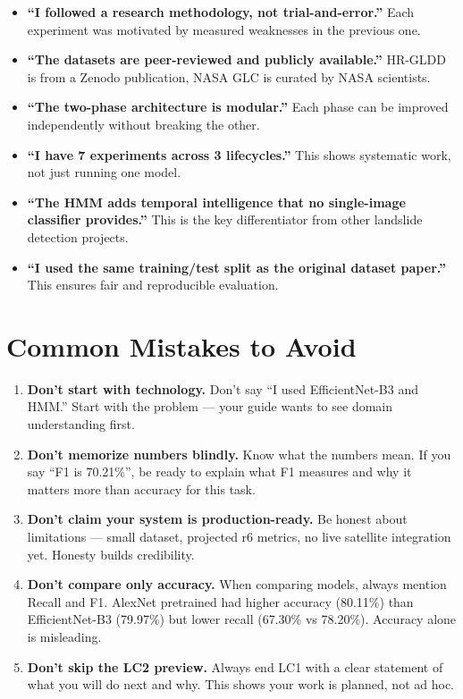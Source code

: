 \documentclass[11pt]{article}
\begin{document}
\begin{itemize}
    \item \textbf{``I followed a research methodology, not trial-and-error.''} Each experiment was motivated by measured weaknesses in the previous one.

    \item \textbf{``The datasets are peer-reviewed and publicly available.''} HR-GLDD is from a Zenodo publication, NASA GLC is curated by NASA scientists.

    \item \textbf{``The two-phase architecture is modular.''} Each phase can be improved independently without breaking the other.

    \item \textbf{``I have 7 experiments across 3 lifecycles.''} This shows systematic work, not just running one model.

    \item \textbf{``The HMM adds temporal intelligence that no single-image classifier provides.''} This is the key differentiator from other landslide detection projects.

    \item \textbf{``I used the same training/test split as the original dataset paper.''} This ensures fair and reproducible evaluation.
\end{itemize}

\section{Common Mistakes to Avoid}

\begin{enumerate}
    \item \textbf{Don't start with technology.} Don't say ``I used EfficientNet-B3 and HMM.'' Start with the problem --- your guide wants to see domain understanding first.

    \item \textbf{Don't memorize numbers blindly.} Know what the numbers mean. If you say ``F1 is 70.21\%'', be ready to explain what F1 measures and why it matters more than accuracy for this task.

    \item \textbf{Don't claim your system is production-ready.} Be honest about limitations --- small dataset, projected r6 metrics, no live satellite integration yet. Honesty builds credibility.

    \item \textbf{Don't compare only accuracy.} When comparing models, always mention Recall and F1. AlexNet pretrained had higher accuracy (80.11\%) than EfficientNet-B3 (79.97\%) but lower recall (67.30\% vs 78.20\%). Accuracy alone is misleading.

    \item \textbf{Don't skip the LC2 preview.} Always end LC1 with a clear statement of what you will do next and why. This shows your work is planned, not ad hoc.
\end{enumerate}
\end{document}
